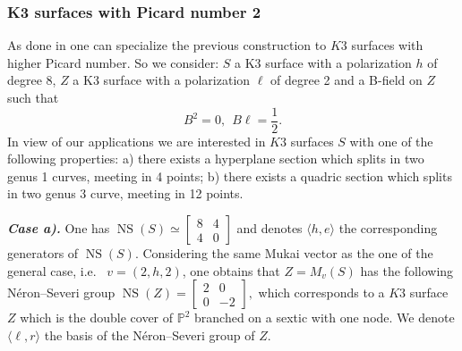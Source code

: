 \documentclass{amsart}
\theoremstyle{definition}
\numberwithin{equation}{section}
\numberwithin{equation}{section} \theoremstyle{definition}
\DeclareMathOperator{\NS}{NS}
\begin{document}
\subsubsection{K3 surfaces with Picard number 2}\label{13.6.1}
As done in \cite{GvG} one can specialize the previous construction to $K3$ surfaces with higher Picard number. So we consider: $S$ a K3 surface with a polarization $h$ of degree 8, $Z$ a K3 surface with a polarization $\ell$ of degree 2 and a B-field  on $Z$ such that $$B^2=0,\ \ B\ell=\frac{1}{2}.$$
In view of our applications we are interested in $K3$ surfaces $S$ with one of the following properties: a) there exists a hyperplane section which splits in two genus 1 curves, meeting in 4 points; b) there exists a quadric section which splits in two genus 3 curve, meeting in 12 points.%

{\it {\bf Case a).}} One has $\NS(S)\simeq \left[\begin{array}{cc}8&4\\4&0\end{array}\right]$ and denotes $\langle h,e\rangle$ the corresponding generators of $\NS(S)$.
Considering the same Mukai vector as the one of the general case, i.e.~ $v=(2,h,2)$, one obtains that $Z=M_v(S)$ has the following N\'eron--Severi group $\NS(Z)=\left[\begin{array}{rr}2&0\\0&-2\end{array}\right],$ which corresponds to a $K3$ surface $Z$ which is the double cover of $\mathbb{P}^2$ branched on a sextic with one node. We denote $\langle \ell, r\rangle$ the basis of the N\'eron--Severi group of $Z$.
\end{document}
